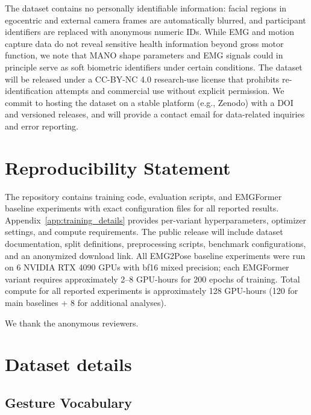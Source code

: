 \documentclass{article}
\newcommand{\model}{EMGFormer}
\begin{document}
The dataset contains no personally identifiable information: facial regions in egocentric and external camera frames are automatically blurred, and participant identifiers are replaced with anonymous numeric IDs. While EMG and motion capture data do not reveal sensitive health information beyond gross motor function, we note that MANO shape parameters and EMG signals could in principle serve as soft biometric identifiers under certain conditions. The dataset will be released under a CC-BY-NC 4.0 research-use license that prohibits re-identification attempts and commercial use without explicit permission. We commit to hosting the dataset on a stable platform (e.g., Zenodo) with a DOI and versioned releases, and will provide a contact email for data-related inquiries and error reporting.

\section*{Reproducibility Statement}

The repository contains training code, evaluation scripts, and \model{} baseline experiments with exact configuration files for all reported results. Appendix~\ref{app:training_details} provides per-variant hyperparameters, optimizer settings, and compute requirements. The public release will include dataset documentation, split definitions, preprocessing scripts, benchmark configurations, and an anonymized download link. All EMG2Pose baseline experiments were run on 6 NVIDIA RTX 4090 GPUs with bf16 mixed precision; each \model{} variant requires approximately 2--8 GPU-hours for 200 epochs of training. Total compute for all reported experiments is approximately 128 GPU-hours (120 for main baselines + 8 for additional analyses).

\begin{ack}
We thank the anonymous reviewers.
\end{ack}




\appendix

\section{Dataset details}

\subsection{Gesture Vocabulary}
\label{app:gesture_vocabulary}
\end{document}
